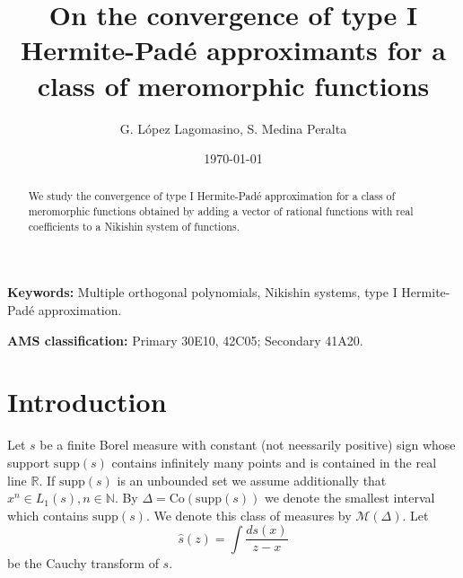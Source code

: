 \documentclass[10pt,a4paper]{article}
\title{On the convergence of type I Hermite-Pad\'e approximants for a class of meromorphic functions}
\date{\today}
\author{G. L\'{o}pez Lagomasino\footnotemark[2], S. Medina Peralta\footnotemark[2]}%
\newcommand{\supp}{\mathrm{supp}}
\theoremstyle{definition}
\theoremstyle{remark}
\numberwithin{equation}{section}
\begin{document}
\maketitle
\renewcommand{\thefootnote}{\fnsymbol{footnote}}

\begin{abstract}
We study the convergence of type I Hermite-Pad\'e approximation for a class of meromorphic functions obtained by adding a vector of rational functions with real coefficients to a Nikishin system of functions.
\end{abstract}

\textbf{Keywords:} Multiple orthogonal polynomials, Nikishin systems,
type I Hermite-Pad\'{e} approximation.

\textbf{AMS classification:} Primary 30E10, 42C05; Secondary 41A20.

\maketitle

\section{Introduction}
\label{section:intro}


Let $s$ be a finite  Borel measure with constant (not neessarily positive) sign whose support $\mbox{supp}(s)$ contains infinitely many points and is contained in the real line $\mathbb{R}$. If $\mbox{supp}(s)$ is an unbounded set we assume additionally that   $x^n \in L_1(s), n \in \mathbb{N}$.  By $\Delta = \mbox{Co}(\mbox{supp}(s))$ we denote the smallest interval which contains  $\supp(s)$.   We denote this class of measures by ${\mathcal{M}}(\Delta)$. Let
\[ \widehat{s}(z) = \int\frac{d s(x)}{z-x}
\]
be the Cauchy transform of $s$.
\end{document}
